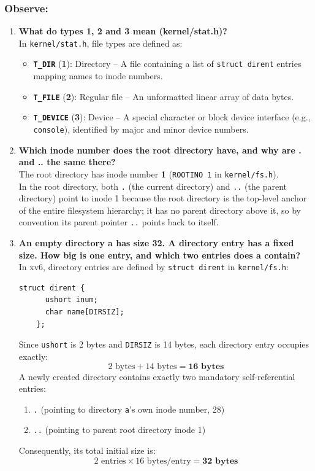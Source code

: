 \documentclass{labreport}
\begin{document}
\subsubsection*{Observe:}
\begin{enumerate}[leftmargin=*]
    \item \textbf{What do types 1, 2 and 3 mean (kernel/stat.h)?}\\[0.2em]
    In \texttt{kernel/stat.h}, file types are defined as:
    \begin{itemize}[noitemsep, topsep=2pt]
        \item \textbf{\texttt{T\_DIR}} (\textbf{1}): Directory -- A file containing a list of \texttt{struct dirent} entries mapping names to inode numbers.
        \item \textbf{\texttt{T\_FILE}} (\textbf{2}): Regular file -- An unformatted linear array of data bytes.
        \item \textbf{\texttt{T\_DEVICE}} (\textbf{3}): Device -- A special character or block device interface (e.g., \texttt{console}), identified by major and minor device numbers.
    \end{itemize}

    \item \textbf{Which inode number does the root directory have, and why are . and .. the same there?}\\[0.2em]
    The root directory has inode number \textbf{1} (\texttt{ROOTINO 1} in \texttt{kernel/fs.h}).\\
    In the root directory, both \texttt{.} (the current directory) and \texttt{..} (the parent directory) point to inode 1 because the root directory is the top-level anchor of the entire filesystem hierarchy; it has no parent directory above it, so by convention its parent pointer \texttt{..} points back to itself.

    \item \textbf{An empty directory a has size 32. A directory entry has a fixed size. How big is one entry, and which two entries does a contain?}\\[0.2em]
    In xv6, directory entries are defined by \texttt{struct dirent} in \texttt{kernel/fs.h}:
    \begin{lstlisting}[style=c]
    struct dirent {
      ushort inum;
      char name[DIRSIZ];
    };
    \end{lstlisting}
    Since \texttt{ushort} is 2 bytes and \texttt{DIRSIZ} is 14 bytes, each directory entry occupies exactly:
    \[
    2 \text{ bytes} + 14 \text{ bytes} = \mathbf{16 \text{ bytes}}
    \]
    A newly created directory contains exactly two mandatory self-referential entries:
    \begin{enumerate}[label=(\alph*), noitemsep]
        \item \texttt{.} (pointing to directory \texttt{a}'s own inode number, 28)
        \item \texttt{..} (pointing to parent root directory inode 1)
    \end{enumerate}
    Consequently, its total initial size is:
    \[
    2 \text{ entries} \times 16 \text{ bytes/entry} = \mathbf{32 \text{ bytes}}
    \]
\end{enumerate}
\end{document}
